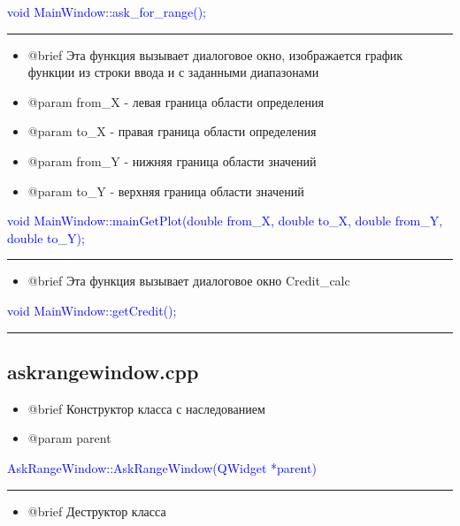\documentclass{article}
\begin{document}
\textcolor{blue}{void MainWindow::ask\_for\_range();}

{\color{red} \rule{\linewidth}{0.5mm}}


\begin{itemize}

\item @brief Эта функция вызывает диалоговое окно, изображается график функции из строки ввода и с заданными диапазонами
\item @param from\_X - левая граница области определения
\item @param to\_X - правая граница области определения
\item @param from\_Y - нижняя граница области значений
\item @param to\_Y - верхняя граница области значений

\end{itemize}

\textcolor{blue}{void MainWindow::mainGetPlot(double from\_X, double to\_X, double from\_Y, double to\_Y);}

{\color{red} \rule{\linewidth}{0.5mm}}


\begin{itemize}

\item @brief Эта функция вызывает диалоговое окно Credit\_calc

\end{itemize}

\textcolor{blue}{void MainWindow::getCredit();}

{\color{red} \rule{\linewidth}{0.5mm}}


\subsection{\textbf{askrangewindow.cpp}}


\begin{itemize}

\item @brief Конструктор класса с наследованием
\item @param parent 

\end{itemize}


\textcolor{blue}{AskRangeWindow::AskRangeWindow(QWidget *parent)}

{\color{red} \rule{\linewidth}{0.5mm}}

\begin{itemize}

\item @brief Деструктор класса

\end{itemize}
\end{document}
